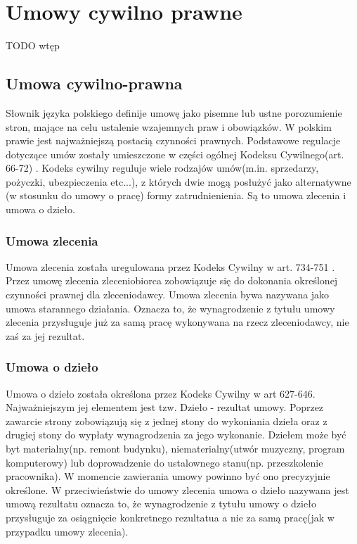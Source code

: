 \chapter{Umowy cywilno prawne}
TODO wtęp

\section[Umowa cywilno-prawna][Umowa cywilno-prawna]{Umowa cywilno-prawna}
Słownik języka polskiego \cite{TODO} definije umowę jako pisemne lub ustne porozumienie stron, mające na celu ustalenie wzajemnych praw i obowiązków. W polskim prawie jest najważniejszą postacią czynności prawnych. Podstawowe regulacje dotyczące umów zostały umieszczone w części ogólnej Kodeksu Cywilnego(art. 66-72) \cite{TODO}. Kodeks cywilny reguluje wiele rodzajów umów(m.in. sprzedarzy, pożyczki, ubezpieczenia etc...), z których dwie mogą posłużyć jako alternatywne (w stosunku do umowy o pracę) formy zatrudnienienia. Są to umowa zlecenia i umowa o dzieło.

\subsection[Umowa zlecenia][Umowa zlecenia]{Umowa zlecenia}
Umowa zlecenia została uregulowana przez Kodeks Cywilny w art. 734-751 \cite{TODO}. Przez umowę zlecenia zleceniobiorca zobowiązuje się do dokonania określonej czynności prawnej dla zleceniodawcy. Umowa zlecenia bywa nazywana jako umowa starannego działania. Oznacza to, że wynagrodzenie z tytułu umowy zlecenia przysługuje już za samą pracę wykonywana na rzecz zleceniodawcy, nie zaś za jej rezultat.

\subsection[Umowa o dzieło][Umowa o dzieło]{Umowa o dzieło}
Umowa o dzieło została określona przez Kodeks Cywilny w art 627-646\cite{TODO}. Najważniejszym jej elementem jest tzw. Dzieło - rezultat umowy. Poprzez zawarcie strony zobowiązują się z jednej stony do wykoniania dzieła oraz z drugiej stony do wypłaty wynagrodzenia za jego wykonanie. Dziełem może być byt materialny(np. remont budynku), niematerialny(utwór muzyczny, program komputerowy) lub doprowadzenie do ustalownego stanu(np. przeszkolenie pracownika). W momencie zawierania umowy powinno być ono precyzyjnie określone. W przeciwieństwie do umowy zlecenia umowa o dzieło nazywana jest umową rezultatu oznacza to, że wynagrodzenie z tytułu umowy o dzieło przysługuje za osiągnięcie konkretnego rezultatua a nie za samą pracę(jak w przypadku umowy zlecenia).

